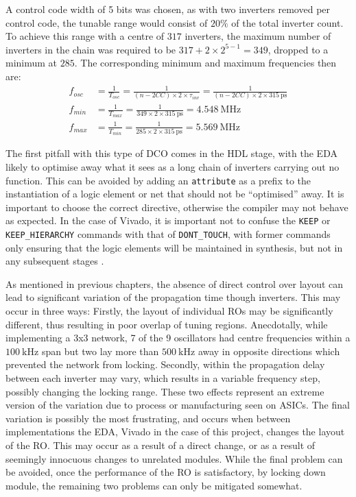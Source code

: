 A control code width of 5 bits was chosen, as with two inverters removed per control code, the tunable range would consist of $20\%$ of the total inverter count. To achieve this range with a centre of $317$ inverters, the maximum number of inverters in the chain was required to be $317+2\times 2^{5-1} = 349$, dropped to a minimum at $285$. The corresponding minimum and maximum frequencies then are:
\begin{align}
f_{osc} &= \frac{1}{T_{osc}} = \frac{1}{(n-2CC)\times 2\times\tau_{inv}} = \frac{1}{(n-2CC)\times 2\times 315~\si{\pico\second}} \\
f_{min} &= \frac{1}{T_{max}} = \frac{1}{349\times 2\times 315~\si{\pico\second}} = 4.548~\si{\mega\hertz} \\
f_{max} &= \frac{1}{T_{min}} = \frac{1}{285\times 2\times 315~\si{\pico\second}} = 5.569~\si{\mega\hertz}
\end{align}

The first pitfall with this type of \ac{DCO} comes in the \ac{HDL} stage, with the \ac{EDA} likely to optimise away what it sees as a long chain of inverters carrying out no function. This can be avoided by adding an \texttt{attribute} as a prefix to the instantiation of a logic element or net that should not be ``optimised'' away. It is important to choose the correct directive, otherwise the compiler may not behave as expected. In the case of Vivado, it is important not to confuse the \texttt{KEEP} or \texttt{KEEP\_HIERARCHY} commands with that of \texttt{DONT\_TOUCH}, with former commands only ensuring that the logic elements will be maintained in synthesis, but not in any subsequent stages \cite{synth_ug}.

As mentioned in previous chapters, the absence of direct control over layout can lead to significant variation of the propagation time though inverters. This may occur in three ways: Firstly, the layout of individual \acp{RO} may be significantly different, thus resulting in poor overlap of tuning regions. Anecdotally, while implementing a 3x3 network, 7 of the 9 oscillators had centre frequencies within a $100~\si{\kilo\hertz}$ span but two lay more than $500~\si{\kilo\hertz}$ away in opposite directions which prevented the network from locking. Secondly, within  the propagation delay between each inverter may vary, which results in a variable frequency step, possibly changing the locking range. These two effects represent an extreme version of the variation due to process or manufacturing seen on \acp{ASIC}. The final variation is possibly the most frustrating, and occurs when between implementations the \ac{EDA}, Vivado in the case of this project, changes the layout of the \ac{RO}. This may occur as a result of a direct change, or as a result of seemingly innocuous changes to unrelated modules. While the final problem can be avoided, once the performance of the \ac{RO} is satisfactory, by locking down module, the remaining two problems can only be mitigated somewhat.

